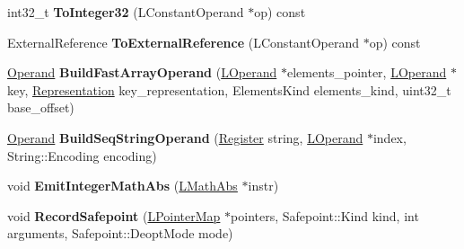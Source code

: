 \begin{DoxyCompactItemize}
\item 
int32\+\_\+t {\bfseries To\+Integer32} (L\+Constant\+Operand $\ast$op) const \hypertarget{classv8_1_1internal_1_1_l_code_gen_a477ff533f07d93b0e1ca5f9290beea36}{}\label{classv8_1_1internal_1_1_l_code_gen_a477ff533f07d93b0e1ca5f9290beea36}

\item 
External\+Reference {\bfseries To\+External\+Reference} (L\+Constant\+Operand $\ast$op) const \hypertarget{classv8_1_1internal_1_1_l_code_gen_a3ca26cfdcbaa03743c656cb06da95f4c}{}\label{classv8_1_1internal_1_1_l_code_gen_a3ca26cfdcbaa03743c656cb06da95f4c}

\item 
\hyperlink{classv8_1_1internal_1_1_operand}{Operand} {\bfseries Build\+Fast\+Array\+Operand} (\hyperlink{classv8_1_1internal_1_1_l_operand}{L\+Operand} $\ast$elements\+\_\+pointer, \hyperlink{classv8_1_1internal_1_1_l_operand}{L\+Operand} $\ast$key, \hyperlink{classv8_1_1internal_1_1_representation}{Representation} key\+\_\+representation, Elements\+Kind elements\+\_\+kind, uint32\+\_\+t base\+\_\+offset)\hypertarget{classv8_1_1internal_1_1_l_code_gen_a96354b52eae3401a603556c6e11b44aa}{}\label{classv8_1_1internal_1_1_l_code_gen_a96354b52eae3401a603556c6e11b44aa}

\item 
\hyperlink{classv8_1_1internal_1_1_operand}{Operand} {\bfseries Build\+Seq\+String\+Operand} (\hyperlink{structv8_1_1internal_1_1_register}{Register} string, \hyperlink{classv8_1_1internal_1_1_l_operand}{L\+Operand} $\ast$index, String\+::\+Encoding encoding)\hypertarget{classv8_1_1internal_1_1_l_code_gen_a267f61edcc17719d1bbbecda994bc6c2}{}\label{classv8_1_1internal_1_1_l_code_gen_a267f61edcc17719d1bbbecda994bc6c2}

\item 
void {\bfseries Emit\+Integer\+Math\+Abs} (\hyperlink{classv8_1_1internal_1_1_l_math_abs}{L\+Math\+Abs} $\ast$instr)\hypertarget{classv8_1_1internal_1_1_l_code_gen_a47f49c0b36ce0adea0f302d6d3e44716}{}\label{classv8_1_1internal_1_1_l_code_gen_a47f49c0b36ce0adea0f302d6d3e44716}

\item 
void {\bfseries Record\+Safepoint} (\hyperlink{classv8_1_1internal_1_1_l_pointer_map}{L\+Pointer\+Map} $\ast$pointers, Safepoint\+::\+Kind kind, int arguments, Safepoint\+::\+Deopt\+Mode mode)\hypertarget{classv8_1_1internal_1_1_l_code_gen_a5c5e6c0360111f74e6c274c456c70b74}{}\label{classv8_1_1internal_1_1_l_code_gen_a5c5e6c0360111f74e6c274c456c70b74}


\end{DoxyCompactItemize}
